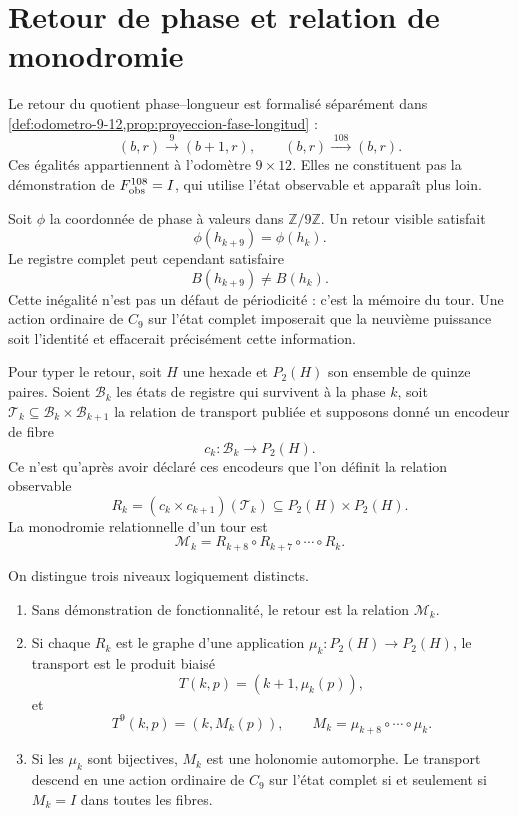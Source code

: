 \section{Retour de phase et relation de monodromie}

Le retour du quotient phase--longueur est formalisé séparément dans
\cref{def:odometro-9-12,prop:proyeccion-fase-longitud} :
\[
(b,r)\xrightarrow{\;9\;}(b+1,r),
\qquad
(b,r)\xrightarrow{\;108\;}(b,r).
\]
Ces égalités appartiennent à l'odomètre \(9\times12\). Elles ne constituent pas la
démonstration de \(F_{\rm obs}^{108}=I\), qui utilise l'état observable et apparaît plus
loin.

Soit \(\phi\) la coordonnée de phase à valeurs dans \(\mathbb Z/9\mathbb Z\).
Un retour visible satisfait
\[
 \phi(h_{k+9})=\phi(h_k).
\]
Le registre complet peut cependant satisfaire
\[
 B(h_{k+9})\ne B(h_k).
\]
Cette inégalité n'est pas un défaut de périodicité : c'est la mémoire du tour.
Une action ordinaire de \(C_9\) sur l'état complet imposerait que la
neuvième puissance soit l'identité et effacerait précisément cette information.

Pour typer le retour, soit \(H\) une hexade et
\(P_2(H)\) son ensemble de quinze paires. Soient \(\mathcal B_k\) les états de
registre qui survivent à la phase \(k\), soit
\(\mathcal T_k\subseteq\mathcal B_k\times\mathcal B_{k+1}\) la relation de
transport publiée et supposons donné un encodeur de fibre
\[
 c_k:\mathcal B_k\longrightarrow P_2(H).
\]
Ce n'est qu'après avoir déclaré ces encodeurs que l'on définit la relation observable
\[
 R_k=(c_k\times c_{k+1})(\mathcal T_k)
 \subseteq P_2(H)\times P_2(H).
\]
La monodromie relationnelle d'un tour est
\[
 \mathcal M_k
 =R_{k+8}\circ R_{k+7}\circ\cdots\circ R_k.
\]

\begin{proposition}
\label{prop:clasificacion-retorno-nonadico}
On distingue trois niveaux logiquement distincts.
\begin{enumerate}
  \item Sans démonstration de fonctionnalité, le retour est la relation
  \(\mathcal M_k\).
  \item Si chaque \(R_k\) est le graphe d'une application
  \(\mu_k:P_2(H)\to P_2(H)\), le transport est le produit biaisé
  \[
   T(k,p)=(k+1,\mu_k(p)),
  \]
  et
  \[
   T^9(k,p)=(k,M_k(p)),
   \qquad
   M_k=\mu_{k+8}\circ\cdots\circ\mu_k.
  \]
  \item Si les \(\mu_k\) sont bijectives, \(M_k\) est une holonomie
  automorphe. Le transport descend en une action ordinaire de
  \(C_9\) sur l'état complet si et seulement si \(M_k=I\) dans toutes les
  fibres.
\end{enumerate}
\end{proposition}

